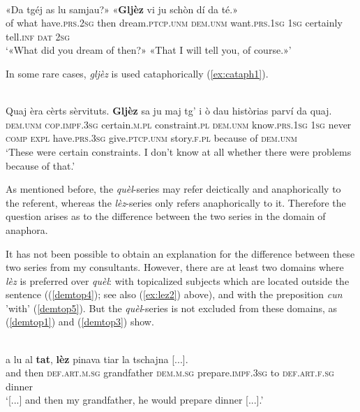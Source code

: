 \ea
\label{ex:lez8}
\\
\gll «Da tgéj as lu samjau?» «\textbf{Gljèz} vi ju schòn dí da té.»\\
     of what have.\textsc{prs.2sg} then dream.\textsc{ptcp.unm} \textsc{dem.unm} want.\textsc{prs.1sg} \textsc{1sg} 
 certainly tell.\textsc{inf} \textsc{dat} \textsc{2sg}\\
\glt `«What did you dream of then?» «That I will tell you, of course.»'
\z

In some rare cases, \textit{gljèz} is used cataphorically (\ref{ex:cataph1}).

\ea\label{ex:cataph1}
\\
\gll  Quaj èra cèrts sèrvituts. \textbf{Gljèz} sa ju maj tg’ i ò dau històrias parví da quaj. \\
    \textsc{dem.unm} \textsc{cop.impf.3sg} certain.\textsc{m.pl} constraint.\textsc{pl} \textsc{dem.unm}  know.\textsc{prs.1sg} \textsc{1sg} never \textsc{comp} \textsc{expl} have.\textsc{prs.3sg} give.\textsc{ptcp.unm} story.\textsc{f.pl} because of \textsc{dem.unm} \\
\glt `These were certain constraints. I don’t know at all whether there were problems because of that.'
\z

As mentioned before, the \textit{quèl}-series may refer deictically and anaphorically to the referent, whereas the \textit{lèz}-series only refers anaphorically to it. Therefore the question arises as to the difference between the two series in the domain of anaphora.

It has not been possible to obtain an explanation for the difference between these two series from my consultants. However, there are at least two domains where \textit{lèz} is preferred over \textit{quèl}: with topicalized subjects which are located outside the sentence ((\ref{demtop4}); see also (\ref{ex:lez2}) above), and with the preposition \textit{cun} 'with' (\ref{demtop5}). But the \textit{quèl}-series is not excluded from these domains, as (\ref{demtop1}) and (\ref{demtop3}) show.

\ea
\label{demtop4}
\\
\gll [...] a lu al \textbf{tat}, \textbf{lèz} pinava tiar la tschajna [...].  \\
  {} and then \textsc{def.art.m.sg} grandfather \textsc{dem.m.sg} prepare.\textsc{impf.3sg} to \textsc{def.art.f.sg} dinner  \\
\glt `[...] and then my grandfather, he would prepare dinner [...].'
\z

